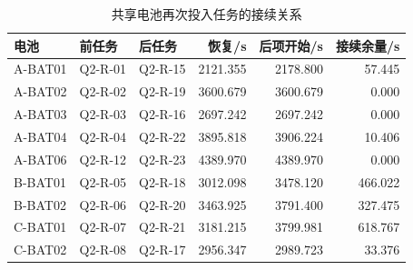 \begin{table}[htbp]\centering\small
\caption{共享电池再次投入任务的接续关系}\label{tab:rev_q2_tight_chains}
\begin{tabular}{lllrrr}\toprule
电池 & 前任务 & 后任务 & 恢复/s & 后项开始/s & 接续余量/s\\\midrule
A-BAT01 & Q2-R-01 & Q2-R-15 & 2121.355 & 2178.800 & 57.445\\
A-BAT02 & Q2-R-02 & Q2-R-19 & 3600.679 & 3600.679 & 0.000\\
A-BAT03 & Q2-R-03 & Q2-R-16 & 2697.242 & 2697.242 & 0.000\\
A-BAT04 & Q2-R-04 & Q2-R-22 & 3895.818 & 3906.224 & 10.406\\
A-BAT06 & Q2-R-12 & Q2-R-23 & 4389.970 & 4389.970 & 0.000\\
B-BAT01 & Q2-R-05 & Q2-R-18 & 3012.098 & 3478.120 & 466.022\\
B-BAT02 & Q2-R-06 & Q2-R-20 & 3463.925 & 3791.400 & 327.475\\
C-BAT01 & Q2-R-07 & Q2-R-21 & 3181.215 & 3799.981 & 618.767\\
C-BAT02 & Q2-R-08 & Q2-R-17 & 2956.347 & 2989.723 & 33.376\\
\bottomrule\end{tabular}
\end{table}
